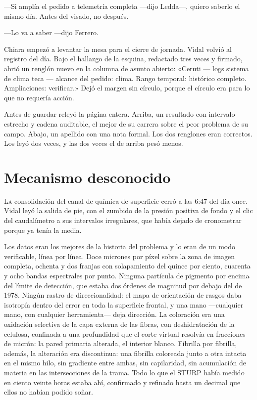 ---Si amplía el pedido a telemetría completa ---dijo Ledda---, quiero saberlo el mismo día. Antes del visado, no después.

---Lo va a saber ---dijo Ferrero.

Chiara empezó a levantar la mesa para el cierre de jornada. Vidal volvió al registro del día. Bajo el hallazgo de la esquina, redactado tres veces y firmado, abrió un renglón nuevo en la columna de asunto abierto: «Ceruti --- logs sistema de clima teca --- alcance del pedido: clima. Rango temporal: histórico completo. Ampliaciones: verificar.» Dejó el margen sin círculo, porque el círculo era para lo que no requería acción.

Antes de guardar releyó la página entera. Arriba, un resultado con intervalo estrecho y cadena auditable, el mejor de su carrera sobre el peor problema de su campo. Abajo, un apellido con una nota formal. Los dos renglones eran correctos. Los leyó dos veces, y las dos veces el de arriba pesó menos.

\clearpage

\chapter{Mecanismo desconocido}

\lettrine[lines=2, lhang=0.1, nindent=0.2em]{L}{a} consolidación del canal de química de superficie cerró a las 6:47 del día once. Vidal leyó la salida de pie, con el zumbido de la presión positiva de fondo y el clic del caudalímetro a sus intervalos irregulares, que había dejado de cronometrar porque ya tenía la media.


Los datos eran los mejores de la historia del problema y lo eran de un modo verificable, línea por línea. Doce micrones por píxel sobre la zona de imagen completa, ochenta y dos franjas con solapamiento del quince por ciento, cuarenta y ocho bandas espectrales por punto. Ninguna partícula de pigmento por encima del límite de detección, que estaba dos órdenes de magnitud por debajo del de 1978. Ningún rastro de direccionalidad: el mapa de orientación de rasgos daba isotropía dentro del error en toda la superficie frontal, y una mano ---cualquier mano, con cualquier herramienta--- deja dirección. La coloración era una oxidación selectiva de la capa externa de las fibras, con deshidratación de la celulosa, confinada a una profundidad que el corte virtual resolvía en fracciones de micrón: la pared primaria alterada, el interior blanco. Fibrilla por fibrilla, además, la alteración era discontinua: una fibrilla coloreada junto a otra intacta en el mismo hilo, sin gradiente entre ambas, sin capilaridad, sin acumulación de materia en las intersecciones de la trama. Todo lo que el STURP había medido en ciento veinte horas estaba ahí, confirmado y refinado hasta un decimal que ellos no habían podido soñar.

